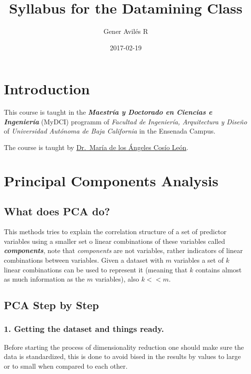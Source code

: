 \documentclass[]{book}
\title{Syllabus for the Datamining Class}
\author{Gener Avilés R}
\date{2017-02-19}
\begin{document}
\maketitle

{
\setcounter{tocdepth}{1}
\tableofcontents
}
\chapter{Introduction}\label{introduction}

This course is taught in the \textbf{\emph{Maestría y Doctorado en
Ciencias e Ingeniería}} (MyDCI) programm of \emph{Facultad de
Ingeniería, Arquitectura y Diseño} of \emph{Universidad Autónoma de Baja
California} in the Ensenada Campus.

The course is taught by
\href{https://www.researchgate.net/profile/Maria_Cosio_Leon}{Dr.~María
de los Ángeles Cosío León}.

\chapter{Principal Components Analysis}\label{intro}

\section{What does PCA do?}\label{what-does-pca-do}

This methods tries to explain the correlation structure of a set of
predictor variables using a smaller set o linear combinations of these
variables called \textbf{\emph{components}}, note that \emph{components}
are not variables, rather indicators of linear combinations between
variables. Given a dataset with \(m\) variables a set of \(k\) linear
combinations can be used to represent it (meaning that \(k\) contains
almost as much information as the \(m\) variables), also \(k<<m\).

\section{PCA Step by Step}\label{pca-step-by-step}

\subsection{1. Getting the dataset and things
ready.}\label{getting-the-dataset-and-things-ready.}

Before starting the process of dimensionality reduction one should make
sure the data is standardized, this is done to avoid bised in the
results by values to large or to small when compared to each other.
\end{document}
